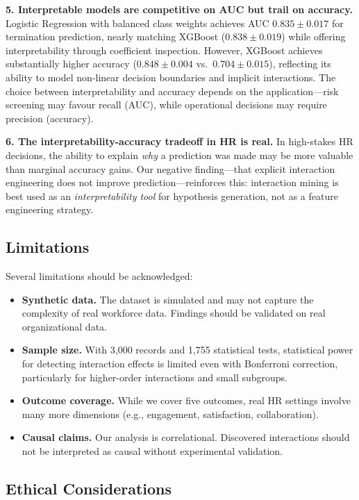 \documentclass[twocolumn]{article}
\begin{document}
\textbf{5. Interpretable models are competitive on AUC but trail on accuracy.} Logistic Regression with balanced class weights achieves AUC $0.835\pm0.017$ for termination prediction, nearly matching XGBoost ($0.838\pm0.019$) while offering interpretability through coefficient inspection. However, XGBoost achieves substantially higher accuracy ($0.848\pm0.004$ vs.\ $0.704\pm0.015$), reflecting its ability to model non-linear decision boundaries and implicit interactions. The choice between interpretability and accuracy depends on the application---risk screening may favour recall (AUC), while operational decisions may require precision (accuracy).

\textbf{6. The interpretability-accuracy tradeoff in HR is real.} In high-stakes HR decisions, the ability to explain \textit{why} a prediction was made may be more valuable than marginal accuracy gains. Our negative finding---that explicit interaction engineering does not improve prediction---reinforces this: interaction mining is best used as an \textit{interpretability tool} for hypothesis generation, not as a feature engineering strategy.

\subsection{Limitations}

Several limitations should be acknowledged:

\begin{itemize}
    \item \textbf{Synthetic data.} The dataset is simulated and may not capture the complexity of real workforce data. Findings should be validated on real organizational data.
    \item \textbf{Sample size.} With 3,000 records and 1,755 statistical tests, statistical power for detecting interaction effects is limited even with Bonferroni correction, particularly for higher-order interactions and small subgroups.
    \item \textbf{Outcome coverage.} While we cover five outcomes, real HR settings involve many more dimensions (e.g., engagement, satisfaction, collaboration).
    \item \textbf{Causal claims.} Our analysis is correlational. Discovered interactions should not be interpreted as causal without experimental validation.
\end{itemize}

\subsection{Ethical Considerations}
\end{document}
